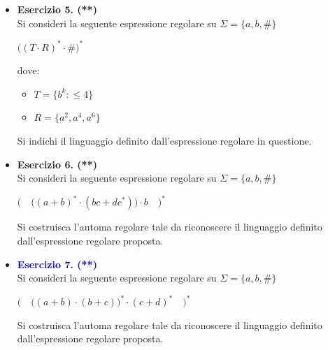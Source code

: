 \documentclass[a4paper,10pt]{article}
\begin{document}
{\begin{itemize}[label=, leftmargin=0pt]
\underline{\textit{\textbf{Identificazione del linguaggio regolare definito da una espressione regolare}}}
    
    \item \textbf{Esercizio 5. (**)}\\ Si consideri la seguente espressione regolare su $\Sigma=\{a,b,\#\}$
    {\begin{center}
        $\bigg((T\cdot R)^* \cdot \#\bigg)^*$
    \end{center}} 
    dove:
    \begin{itemize}[label=]
        \item $T=\{b^k:\leq 4\}$
        \item $R =\{a^2, a^4, a^6\}$
    \end{itemize}
    Si indichi il linguaggio definito dall'espressione regolare in questione.\\

    \item \textbf{Esercizio 6. (**)}\\ Si consideri la seguente espressione regolare su $\Sigma=\{a,b,\#\}$
    {\begin{center}
        $\bigg( \quad \bigg((a+b)^*\cdot(bc+dc^*)\bigg) \cdot b\quad\bigg)^*$
    \end{center}} 
    Si costruisca l'automa regolare tale da riconoscere il linguaggio definito dall'espressione regolare proposta.\\

    \item \textbf{\textcolor{blue}{Esercizio 7. (**)}}\\ Si consideri la seguente espressione regolare su $\Sigma=\{a,b,\#\}$
    {\begin{center}
        $\bigg(\quad \bigg((a + b)\cdot (b +c)\bigg)^*\cdot (c + d)^*\quad \bigg)^*$
    \end{center}} 

    
    Si costruisca l'automa regolare tale da riconoscere il linguaggio definito dall'espressione regolare proposta.\\


    
\end{itemize}
}
\vfill
\noindent\makebox[\linewidth]{\rule{\linewidth}{0.1pt}}
\end{document}
